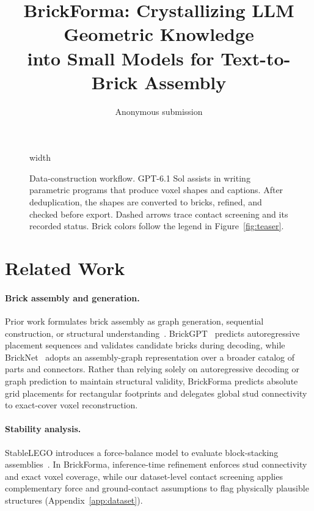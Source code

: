 \documentclass[letterpaper]{article} %
\title{BrickForma: Crystallizing LLM Geometric Knowledge\\into Small Models for Text-to-Brick Assembly}
\author{Anonymous submission}
\begin{document}
\maketitle




\begin{figure}[t]
\centering
\begingroup
\pdfximage width \textwidth {figure2.pdf}%
\pdfrefximage\pdflastximage\endgroup
\caption{Data-construction workflow. GPT-6.1 Sol assists in writing parametric programs that produce voxel shapes and captions. After deduplication, the shapes are converted to bricks, refined, and checked before export. Dashed arrows trace contact screening and its recorded status. Brick colors follow the legend in Figure~\ref{fig:teaser}.}
\label{fig:data-workflow}
\end{figure}

\section{Related Work}
\paragraph{Brick assembly and generation.}
Prior work formulates brick assembly as graph generation, sequential construction, or structural understanding~\cite{thompson2020lego,brickbybrick,breakandmake}. BrickGPT~\cite{brickgpt} predicts autoregressive placement sequences and validates candidate bricks during decoding, while BrickNet~\cite{bricknet} adopts an assembly-graph representation over a broader catalog of parts and connectors. Rather than relying solely on autoregressive decoding or graph prediction to maintain structural validity, BrickForma predicts absolute grid placements for rectangular footprints and delegates global stud connectivity to exact-cover voxel reconstruction.

\paragraph{Stability analysis.}
StableLEGO introduces a force-balance model to evaluate block-stacking assemblies~\cite{stablelego}. In BrickForma, inference-time refinement enforces stud connectivity and exact voxel coverage, while our dataset-level contact screening applies complementary force and ground-contact assumptions to flag physically plausible structures (Appendix~\ref{app:dataset}).
\end{document}
